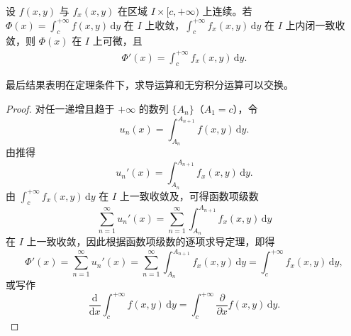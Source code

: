 \documentclass[../../main.tex]{subfiles}%
\begin{document}
\begin{theorem}[含参反常积分的可微性]\label{theorem:含参反常积分的可微性}
设 \( f(x,y) \) 与 \( f_x(x,y) \) 在区域 \( I \times [c, +\infty) \) 上连续。若 \( \Phi(x) = \int_{c}^{+\infty} f(x,y) \, \mathrm{d}y \) 在 \( I \) 上收敛，\( \int_{c}^{+\infty} f_x(x,y) \, \mathrm{d}y \) 在 \( I \) 上内闭一致收敛，则 \( \Phi(x) \) 在 \( I \) 上可微，且
\begin{align}\label{eq::::--34802jrw4f345634t}
\Phi'(x) = \int_{c}^{+\infty} f_x(x,y) \, \mathrm{d}y.
\end{align}
\end{theorem}
\begin{note}
最后结果表明在定理条件下，求导运算和无穷积分运算可以交换。
\end{note}
\begin{proof}

对任一递增且趋于 \( +\infty \) 的数列 \( \{A_n\} \)（\( A_1 = c \)），令
\[
u_n(x) = \int_{A_n}^{A_{n+1}} f(x,y) \, \mathrm{d}y.
\]
由推得
\[
u_n'(x) = \int_{A_n}^{A_{n+1}} f_x(x,y) \, \mathrm{d}y.
\]
由 \( \int_{c}^{+\infty} f_x(x,y) \, \mathrm{d}y \) 在 \( I \) 上一致收敛及，可得函数项级数
\[
\sum_{n=1}^{\infty} u_n'(x) = \sum_{n=1}^{\infty} \int_{A_n}^{A_{n+1}} f_x(x,y) \, \mathrm{d}y
\]
在 \( I \) 上一致收敛，因此根据函数项级数的逐项求导定理，即得
\[
\Phi'(x) = \sum_{n=1}^{\infty} u_n'(x) = \sum_{n=1}^{\infty} \int_{A_n}^{A_{n+1}} f_x(x,y) \, \mathrm{d}y = \int_{c}^{+\infty} f_x(x,y) \, \mathrm{d}y,
\]
或写作
\[
\frac{\mathrm{d}}{\mathrm{d}x} \int_{c}^{+\infty} f(x,y) \, \mathrm{d}y = \int_{c}^{+\infty} \frac{\partial}{\partial x} f(x,y) \, \mathrm{d}y.
\]

\end{proof}
\end{document}
